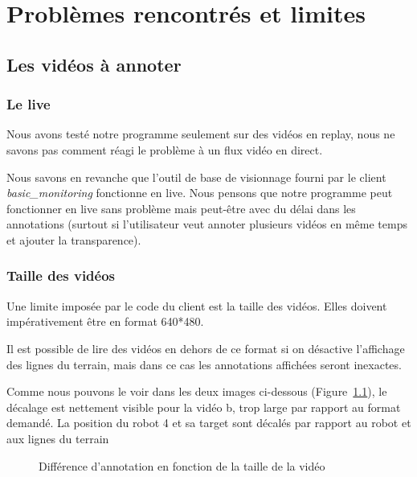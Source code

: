 \chapter{Problèmes rencontrés et limites}

\section{Les vidéos à annoter}

\subsection{Le live}

Nous avons testé notre programme seulement sur des vidéos en
replay, nous ne savons pas comment réagi le problème à un flux
vidéo en direct.
\bigskip

Nous savons en revanche que l'outil de base de visionnage fourni
par le client \textit{basic\_monitoring} fonctionne en live. Nous
pensons que notre programme peut fonctionner en live sans
problème mais peut-être avec du délai dans les annotations
(surtout si l'utilisateur veut annoter plusieurs vidéos en même
temps et ajouter la transparence).
\bigskip

\subsection{Taille des vidéos}

Une limite imposée par le code du client est la taille des
vidéos. Elles doivent impérativement être en format 640*480. 

Il est possible de lire des vidéos en dehors de ce format si on
désactive l'affichage des lignes du terrain, mais dans ce cas les
annotations affichées seront inexactes.
\bigskip

Comme nous pouvons le voir dans les deux images ci-dessous
(Figure~\ref{fig:sizevideo}), le décalage est nettement visible
pour la vidéo b, trop large par rapport au format demandé. La
position du robot 4 et sa target sont décalés par rapport au
robot et aux lignes du terrain

\begin{figure}[H]
    \centering
     \qquad
    \caption{Différence d'annotation en fonction de la taille de
    la vidéo}
    \label{fig:sizevideo}
\end{figure}

